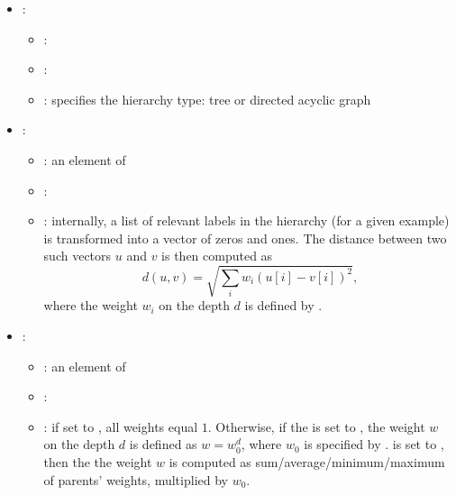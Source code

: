 \begin{itemize}
    \item {}:
           \begin{itemize}
                \item \optionPossibleValues{}: 
                \item \optionDefaultValue{}: 
                \item \optionDescrption{}: specifies the hierarchy type: tree or directed acyclic graph \cite{Vens08:jrnl}
           \end{itemize}
    \item {}:
           \begin{itemize}
                \item \optionPossibleValues{}: an element of    
                \item \optionDefaultValue{}: 
                \item \optionDescrption{}: internally, a list of relevant labels in the hierarchy (for a given example) is transformed into a vector of zeros and ones. The distance between
                two such vectors $u$ and $v$ is then computed as
                $$
                d(u, v) = \sqrt{\sum_i w_i (u[i] - v[i])^2}\text{,}
                $$
                where the weight $w_i$ on the depth $d$ is defined by .
           \end{itemize}
    \item {}:
           \begin{itemize}
                \item \optionPossibleValues{}: an element of 
                \item \optionDefaultValue{}: 
                \item \optionDescrption{}: if set to , all weights equal $1$. Otherwise, if the  is set to , the
                weight $w$ on the depth $d$ is defined as $w = w_0^d$, where $w_0$ is specified by .  is set to , then the
                the weight $w$ is computed as sum/average/minimum/maximum of parents' weights, multiplied by $w_0$.

\end{itemize}
\end{itemize}
